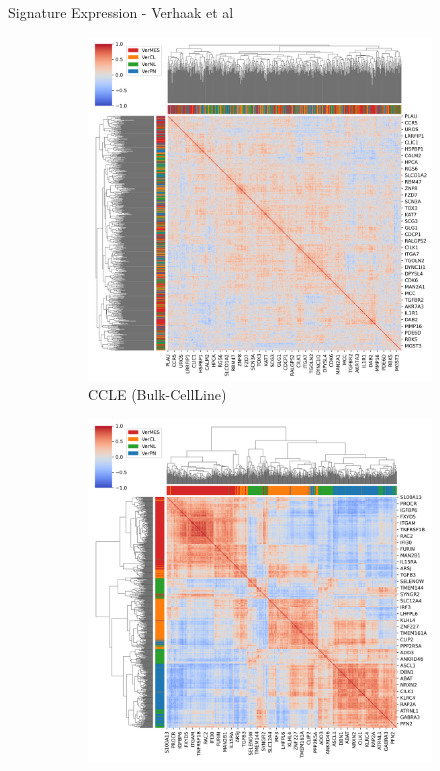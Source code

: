 \documentclass[aspectratio=169,9pt]{beamer}
\begin{document}
    \begin{frame}{Signature Expression - Verhaak et al}
        \begin{adjustwidth}{-5cm}{-5cm}
            \centering
            \begin{figure}\ContinuedFloat
                \centering
                \begin{subfigure}[c]{0.48\textwidth}
                    \centering
                    \includegraphics[width=\textwidth]{CCLE_Corrplot_Ver}
                    \caption{CCLE (Bulk-CellLine)}
                \end{subfigure}
                \begin{subfigure}[c]{0.48\textwidth}
                    \centering
                    \includegraphics[width=\textwidth]{TCGA_Corrplot_Ver}

\end{subfigure}
\end{figure}
\end{adjustwidth}
\end{frame}
\end{document}
